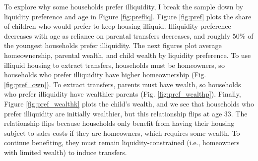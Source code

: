 \documentclass[12pt]{article}
\begin{document}
To explore why some households prefer illiquidity, I break the sample down by liquidity preference and age in Figure \ref{fig:prefliq}. Figure \ref{fig:pref} plots the share of children who would prefer to keep housing illiquid.  Illiquidity preference decreases with age as reliance on parental transfers decreases, and roughly 50\% of the youngest households prefer illiquidity. The next figures plot average homeownership, parental wealth, and child wealth by liquidity preference. To use illiquid housing to extract transfers, households must be homeowners, so households who prefer illiquidity have higher homeownership (Fig. \ref{fig:pref_own}). To extract transfers, parents must have wealth, so households who prefer illiquidity have wealthier parents (Fig. \ref{fig:pref_wealthp}). Finally, Figure \ref{fig:pref_wealthk} plots the child's wealth, and we see that households who prefer illiquidity are initially wealthier, but this relationship flips at age 33. The relationship flips because households only benefit from having their housing subject to sales costs if they are homeowners, which requires some wealth. To continue benefiting, they must remain liquidity-constrained (i.e., homeowners with limited wealth) to induce transfers.
\end{document}
